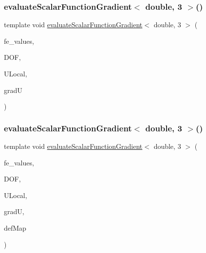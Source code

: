 \mbox{\label{function_evaluations_8cc_a9c4d97c0a964edc8d705a9086abc7a87}} 
\subsubsection{\texorpdfstring{evaluateScalarFunctionGradient$<$ double, 3 $>$()}{evaluateScalarFunctionGradient< double, 3 >()}\hspace{0.1cm}{\footnotesize\ttfamily [1/4]}}
{\footnotesize\ttfamily template void \mbox{\hyperlink{group___evaluation_functions_gabedd4ae2841d2332ed0df0513b189e34}{evaluate\+Scalar\+Function\+Gradient}}$<$ double, 3 $>$ (\begin{DoxyParamCaption}\item[{const F\+E\+Values$<$ 3 $>$ \&}]{fe\+\_\+values,  }\item[{unsigned int}]{D\+OF,  }\item[{Table$<$ 1, double $>$ \&}]{U\+Local,  }\item[{Table$<$ 2, double $>$ \&}]{gradU }\end{DoxyParamCaption})}

\mbox{\label{function_evaluations_8cc_a57903628597a149ecf0c07eb33c3cc94}} 
\subsubsection{\texorpdfstring{evaluateScalarFunctionGradient$<$ double, 3 $>$()}{evaluateScalarFunctionGradient< double, 3 >()}\hspace{0.1cm}{\footnotesize\ttfamily [2/4]}}
{\footnotesize\ttfamily template void \mbox{\hyperlink{group___evaluation_functions_gabedd4ae2841d2332ed0df0513b189e34}{evaluate\+Scalar\+Function\+Gradient}}$<$ double, 3 $>$ (\begin{DoxyParamCaption}\item[{const F\+E\+Values$<$ 3 $>$ \&}]{fe\+\_\+values,  }\item[{unsigned int}]{D\+OF,  }\item[{Table$<$ 1, double $>$ \&}]{U\+Local,  }\item[{Table$<$ 2, double $>$ \&}]{gradU,  }\item[{\mbox{\hyperlink{structdeformation_map}{deformation\+Map}}$<$ double, 3 $>$ \&}]{def\+Map }\end{DoxyParamCaption})}

